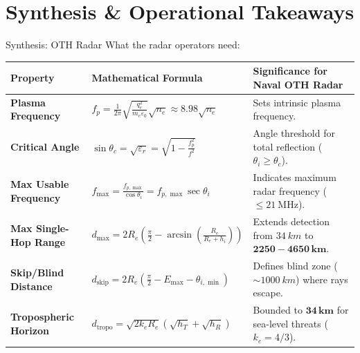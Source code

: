 \documentclass[aspectratio=169, 10pt]{beamer}
\newcommand{\km}{km} %
\begin{document}

\section{Synthesis \& Operational Takeaways}

\begin{frame}{Synthesis: OTH Radar}
    What the radar operators need:
    \begin{table}[h]
        \centering
        \small
        \renewcommand{\arraystretch}{1.6}
        \begin{tabular}{@{}lll@{}}
            \toprule
            \textbf{Property} & \textbf{Mathematical Formula} & \textbf{Significance for Naval OTH Radar} \\ \midrule
            \textbf{Plasma Frequency} & $f_p = \frac{1}{2\pi}\sqrt{\frac{q_e^2}{m_e\varepsilon_0}}\sqrt{n_e} \approx 8.98\sqrt{n_e}$ & Sets intrinsic plasma frequency. \\
            \textbf{Critical Angle} & $\sin\theta_c = \sqrt{\varepsilon_r} = \sqrt{1 - \frac{f_p^2}{f^2}}$ & Angle threshold for total reflection ($\theta_i \ge \theta_c$). \\
            \textbf{Max Usable Frequency} & $f_{\max} = \frac{f_{p,\max}}{\cos\theta_i} = f_{p,\max}\sec\theta_i$ & Indicates maximum radar frequency ($\le \SI{21}{\mega\hertz}$). \\
            \textbf{Max Single-Hop Range} & $d_{\max} = 2 R_e \left(\frac{\pi}{2} - \arcsin\left(\frac{R_e}{R_e+h_i}\right)\right)$ & Extends detection from $\SI{34}{\km}$ to $\mathbf{2250 - 4650\,\si{\km}}$. \\
            \textbf{Skip/Blind Distance} & $d_{\text{skip}} = 2 R_e \left(\frac{\pi}{2} - E_{\max} - \theta_{i,\min}\right)$ & Defines blind zone ($\sim \SI{1000}{\km}$) where rays escape. \\
            \textbf{Tropospheric Horizon} & $d_{\text{tropo}} = \sqrt{2 k_e R_e}\left(\sqrt{h_T} + \sqrt{h_R}\right)$ & Bounded to $\mathbf{34\,\si{\km}}$ for sea-level threats ($k_e=4/3$). \\ \bottomrule
        \end{tabular}
    \end{table}
\end{frame}
\end{document}

